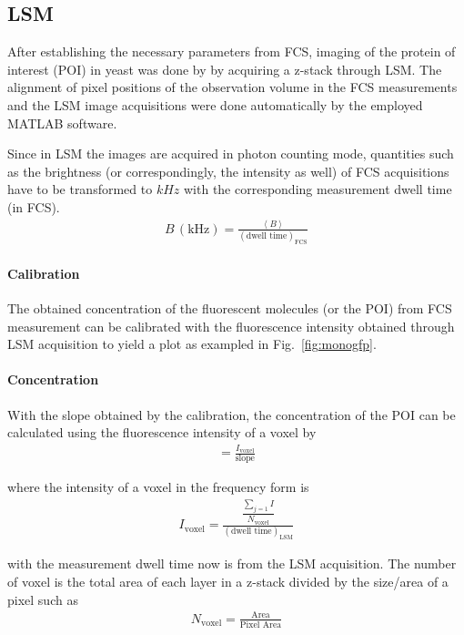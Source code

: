 \subsection{LSM}

After establishing the necessary parameters from FCS, imaging of the protein of interest (POI) in yeast was done by by acquiring a z-stack through LSM. 
The alignment of pixel positions of the observation volume in the FCS measurements and the LSM image acquisitions were done automatically by the employed MATLAB software. 

Since in LSM the images are acquired in photon counting mode, quantities such as the brightness (or correspondingly, the intensity as well) of FCS acquisitions have to be transformed to $kHz$ with the corresponding measurement dwell time (in FCS).
\begin{align} 
B\,(\text{kHz}) = \frac{\left\langle B\right\rangle }{(\text{dwell time})_{\text{FCS}}}
\end{align}

\paragraph{Calibration} 
The obtained concentration of the fluorescent molecules (or the POI) from FCS measurement can be calibrated with the fluorescence intensity obtained through LSM acquisition to yield a plot as exampled in Fig.~\ref{fig:monogfp}.  

\paragraph{Concentration}
With the slope obtained by the calibration, the concentration of the POI can be calculated using the fluorescence intensity of a voxel by
\begin{align} 
[C] = \frac{I_{\text{voxel}}}{\text{slope}}
\end{align}

where the intensity of a voxel in the frequency form is
\begin{align} 
I_{\text{voxel}} = \frac{\dfrac{\sum_{j=1}^{} I}{N_{\text{voxel}}}}{(\text{dwell time})_{\text{LSM}}} 
\end{align}

with the measurement dwell time now is from the LSM acquisition. The number of voxel is the total area of each layer in a z-stack divided by the size/area of a pixel such as
\begin{align} 
N_{\text{voxel}} = \frac{\text{Area}}{\text{Pixel Area}}
\end{align}

